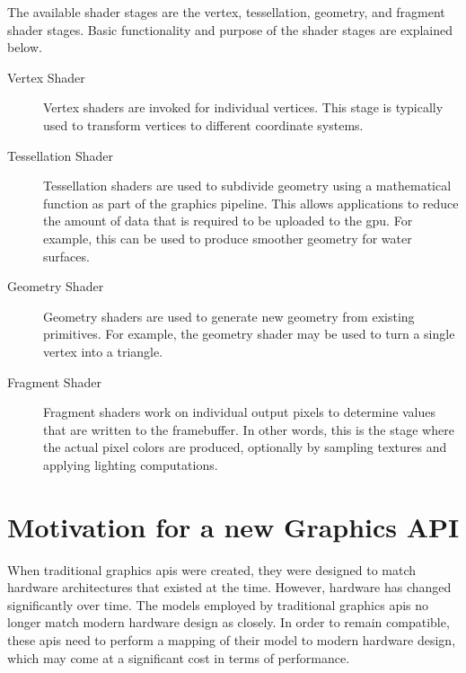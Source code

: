     The available shader stages are the vertex, tessellation, geometry, and fragment shader stages.
    Basic functionality and purpose of the shader stages are explained below.

    \begin{description}
      \item[Vertex Shader]
        Vertex shaders are invoked for individual vertices.
        This stage is typically used to transform vertices to different coordinate systems.

      \item[Tessellation Shader]
        Tessellation shaders are used to subdivide geometry using a mathematical function as part of the graphics pipeline.
        This allows applications to reduce the amount of data that is required to be uploaded to the \gls{gpu}.
        For example, this can be used to produce smoother geometry for water surfaces.

      \item[Geometry Shader]
        Geometry shaders are used to generate new geometry from existing primitives.
        For example, the geometry shader may be used to turn a single vertex into a triangle.

      \item[Fragment Shader]
        Fragment shaders work on individual output pixels to determine values that are written to the framebuffer.
        In other words, this is the stage where the actual pixel colors are produced, optionally by sampling textures and applying lighting computations.
    \end{description}



  \section{Motivation for a new Graphics API}
    When traditional graphics \glspl{api} were created, they were designed to match hardware architectures that existed at the time.
    However, hardware has changed significantly over time.
    The models employed by traditional graphics \glspl{api} no longer match modern hardware design as closely.
    In order to remain compatible, these \glspl{api} need to perform a mapping of their model to modern hardware design, which may come at a significant cost in terms of performance.


